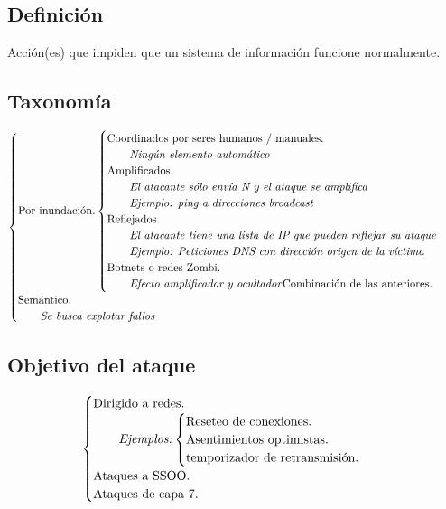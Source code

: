 \begin{Resumen}
\subsection*{Definición}
Acción(es) que impiden que un sistema de información funcione normalmente.

\subsection*{Taxonomía}
\begin{align*}
 \begin{cases}
   \text{Por inundación.}
   \begin{cases}
     \text{Coordinados por seres humanos / manuales.}\\
     \qquad\text{\emph{Ningún elemento automático}}\\
     \text{Amplificados.}\\
     \qquad{\text{\emph{El atacante sólo envía N y el ataque se amplifica}}}\\
     \qquad{\text{\emph{Ejemplo: ping a direcciones broadcast}}}\\
     \text{Reflejados.}\\
     \qquad{\text{\emph{El atacante tiene una lista de IP que pueden reflejar su ataque}}}\\
     \qquad{\text{\emph{Ejemplo: Peticiones DNS con dirección origen de la víctima}}}\\
     \text{Botnets o redes Zombi.}\\
     \qquad{\text{\emph{Efecto amplificador y ocultador}}}
     \text{Combinación de las anteriores.}
   \end{cases}\\
   \text{Semántico.}\\
   \qquad{\text{\emph{Se busca explotar fallos}}}
 \end{cases}
\end{align*}

\subsection*{Objetivo del ataque}
\begin{align*}
 \begin{cases}
   \text{Dirigido a redes.}\\
   \qquad{\text{\emph{Ejemplos:}}}
   \begin{cases}
     \text{Reseteo de conexiones.} \\
     \text{Asentimientos optimistas.} \\
     \text{temporizador de retransmisión.} \\
   \end{cases}\\
   \text{Ataques a SSOO.} \\
   \text{Ataques de capa 7.}\\
 \end{cases}
\end{align*}


\end{Resumen}
